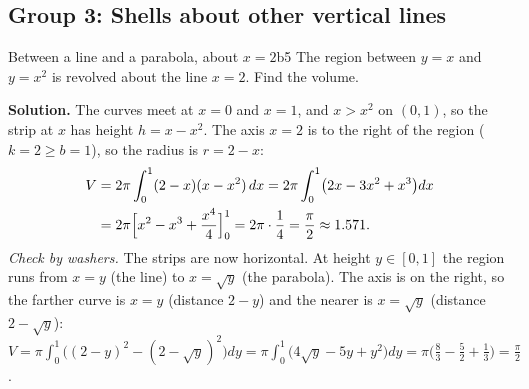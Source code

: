 \documentclass[11pt]{article}
\begin{document}
\subsection*{Group 3: Shells about other vertical lines}

\begin{exmp}{Between a line and a parabola, about $x=2$}{b5}
The region between $y=x$ and $y=x^2$ is revolved about the line $x=2$. Find the volume.

\textbf{Solution.} The curves meet at $x=0$ and $x=1$, and $x>x^2$ on $(0,1)$, so the strip at $x$ has height $h=x-x^2$. The axis $x=2$ is to the right of the region ($k=2\ge b=1$), so the radius is $r=2-x$:
\[
\begin{aligned}V&=2\pi\int_0^1(2-x)(x-x^2)\,dx=2\pi\int_0^1\bigl(2x-3x^2+x^3\bigr)dx\\ &=2\pi\Bigl[x^2-x^3+\frac{x^4}4\Bigr]_0^1=2\pi\cdot\frac14=\frac\pi2\approx1.571 .
\end{aligned}
\]
\emph{Check by washers.} The strips are now horizontal. At height $y\in[0,1]$ the region runs from $x=y$ (the line) to $x=\sqrt y$ (the parabola). The axis is on the right, so the farther curve is $x=y$ (distance $2-y$) and the nearer is $x=\sqrt y$ (distance $2-\sqrt y$): $V=\pi\int_0^1\bigl((2-y)^2-(2-\sqrt y)^2\bigr)dy=\pi\int_0^1\bigl(4\sqrt y-5y+y^2\bigr)dy=\pi\bigl(\frac83-\frac52+\frac13\bigr)=\frac\pi2$.
\begin{center}
\end{center}
\end{exmp}
\end{document}
